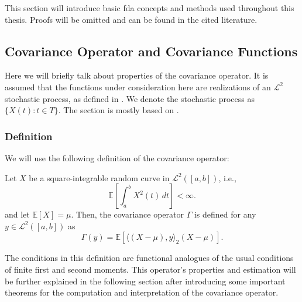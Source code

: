This section will introduce basic fda concepts and methods used throughout this thesis.
Proofs will be omitted and can be found in the cited literature.

\subsection{Covariance Operator and Covariance Functions}
\label{sec:covs}
Here we will briefly talk about properties of the covariance operator. It is assumed
that the functions under consideration here are realizations of an $\mathcal{L}^2$
stochastic process, as defined in \textcite[Chapter~1.1.2]{Ash1975}. We denote the
stochastic process as $\{ X(t) : t \in T \}$. The section is mostly based on
\textcite[Chapter~2]{HorvathKokoszka2012}.

\subsubsection{Definition}
\label{sec:cov_def}
We will use the following definition of the covariance operator:
\begin{definition}
    \label{def:cov_operator}
    Let \( X \) be a square-integrable random curve in \( \mathcal{L}^2([a,b]) \), i.e.,
    \[
        \mathbb{E}\left[ \int_a^b X^2(t) \, dt \right] < \infty.
    \]
    and let \( \mathbb{E}[X] = \mu \). Then, the covariance operator \( \Gamma \) is defined for any \( y \in \mathcal{L}^2([a,b]) \) as
    \[
    \Gamma(y) = \mathbb{E}\left[ \langle (X-\mu), y \rangle_{2} (X-\mu) \right].
    \]
\end{definition}
The conditions in this definition are functional analogues of the usual conditions of
finite first and second moments. This operator's properties and estimation will be further explained
in the following section after introducing some important theorems for the computation
and interpretation of the covariance operator.
